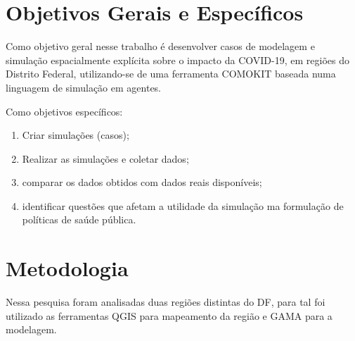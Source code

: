 
\section{Objetivos Gerais e Específicos}%

Como objetivo geral nesse trabalho é desenvolver casos de modelagem e simulação espacialmente explícita sobre o impacto da COVID-19, em regiões do Distrito Federal, utilizando-se de uma ferramenta COMOKIT baseada numa linguagem de simulação  em agentes.

Como objetivos específicos: 
\begin{enumerate}
\item Criar simulações (casos);
\item Realizar as simulações e coletar dados;
\item comparar os dados obtidos com dados reais disponíveis;
\item identificar questões que afetam a utilidade da simulação ma formulação de políticas de saúde pública.


\end{enumerate}

\section{Metodologia}%

Nessa pesquisa foram analisadas duas regiões distintas do DF, para tal foi utilizado as ferramentas QGIS para mapeamento da região e GAMA para a modelagem. 

